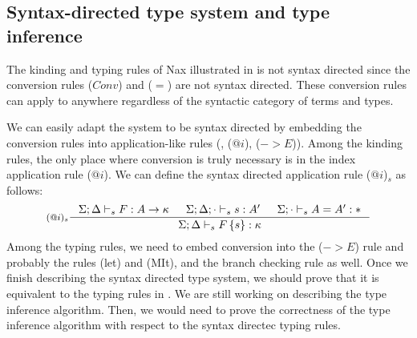 
\subsection{Syntax-directed type system and type inference}
The kinding and typing rules of Nax illustrated in  is not
syntax directed since the conversion rules ($Conv$) and ($=$) are not syntax
directed. These conversion rules can apply to anywhere regardless of the
syntactic category of terms and types.

We can easily adapt the system to be syntax directed by embedding
the conversion rules into application-like rules (\eg, ($@i$), ($->$$E$)).
Among the kinding rules, the only place where conversion is truly necessary
is in the index application rule ($@i$).
We can define the syntax directed application rule ($@i$)$_s$ as follows:
\[ \inference[($@i$)$_s$]{ \Sigma;\Delta |-_s F : A -> \kappa
                     & \Sigma;\Delta;\cdot |-_s s : A'
                     & \Sigma;\cdot |-_s A=A' : * }
                     {\Sigma;\Delta |-_s F\,\{s\} : \kappa}
\]
Among the typing rules, we need to embed conversion into the ($->$$E$) rule
and probably the rules (let) and (MIt), and the branch checking rule as well.
Once we finish describing the syntax directed type system, we should prove
that it is equivalent to the typing rules in .
We are still working on describing the type inference algorithm.
Then, we would need to prove the correctness of the type inference
algorithm with respect to the syntax directec typing rules.


